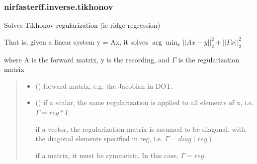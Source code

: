 \documentclass[letterpaper,10pt,english]{sphinxmanual}
\begin{document}
\sphinxstepscope


\subsubsection{nirfasterff.inverse.tikhonov}
\label{\detokenize{_autosummary/nirfasterff.inverse.tikhonov:nirfasterff-inverse-tikhonov}}\label{\detokenize{_autosummary/nirfasterff.inverse.tikhonov::doc}}

\begin{fulllineitems}
\label{\detokenize{_autosummary/nirfasterff.inverse.tikhonov:nirfasterff.inverse.tikhonov}}
\pysigstartsignatures
{}
\pysigstopsignatures
\sphinxAtStartPar
Solves Tikhonov regularization (ie ridge regression)

\sphinxAtStartPar
That is, given a linear system y = Ax, it solves \(\arg\min_x ||Ax-y||_2^2+||\Gamma x||_2^2\)

\sphinxAtStartPar
where A is the forward matrix, y is the recording, and \(\Gamma\) is the regularization matrix
\begin{quote}\begin{description}
\begin{itemize}
\item {} 
\sphinxAtStartPar
{} () \textendash{} forward matrix, e.g. the Jacobian in DOT.

\item {} 
\sphinxAtStartPar
{} () \textendash{} 
\sphinxAtStartPar
if a scalar, the same regularization is applied to all elements of x, i.e. \(\Gamma=reg*I\).

\sphinxAtStartPar
if a vector, the regularization matrix is assumed to be diagonal, with the diagonal elements specified in reg, i.e. \(\Gamma=diag(reg)\).

\sphinxAtStartPar
if a matrix, it must be symmetric. In this case, \(\Gamma=reg\).



\end{itemize}
\end{description}
\end{quote}
\end{fulllineitems}
\end{document}
